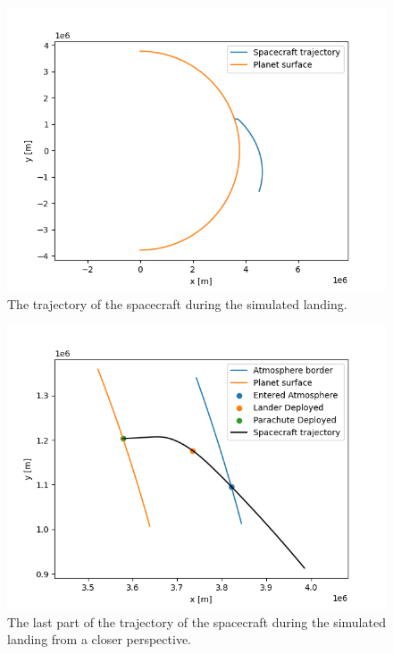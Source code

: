 \documentclass[reprint,english,notitlepage]{revtex4-2}
\begin{document}
\begin{figure}[h]
    \centering
    \includegraphics[scale=0.15]{Figures/sim_landing_far}
    \caption{The trajectory of the spacecraft during the simulated landing.}\label{fig:sim_landing_far}
\end{figure}

\begin{figure}[h]
    \centering
    \includegraphics[scale=0.15]{Figures/sim_landing_close}
    \caption{The last part of the trajectory of the spacecraft during the simulated landing from a closer perspective.}\label{fig:sim_landing_close}
\end{figure}
\end{document}
